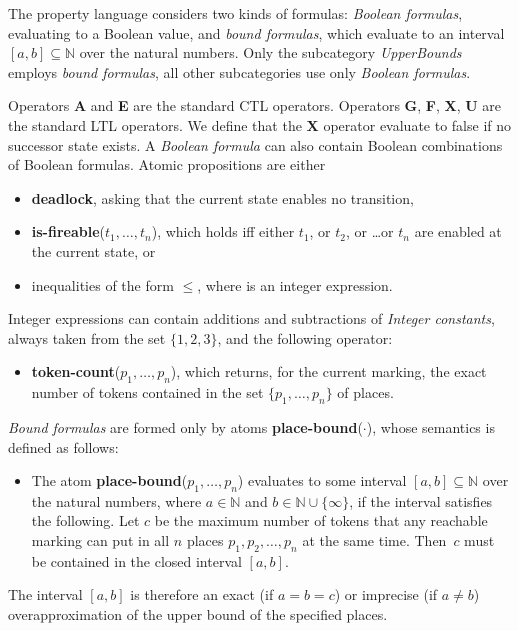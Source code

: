 \documentclass[10pt,english,a4paper]{article}
\newcommand\eqdef            {\mathrel{:=}}
\newcommand\set[1]           {{\{ #1 \mathclose \}}}
\newcommand\N                {\mathbb{N}}
\newcommand\ctla             {\textbf{A}\xspace}
\newcommand\ctle             {\textbf{E}\xspace}
\newcommand\ltlf             {\textbf{F}\xspace}
\newcommand\ltlg             {\textbf{G}\xspace}
\newcommand\ltlx             {\textbf{X}\xspace}
\newcommand\ltlu             {\textbf{U}\xspace}
\newcommand\atomleq          {\boldmath$\leq$\xspace}
\newcommand\atomdead         {\textbf{deadlock}\xspace}
\newcommand\atomisfire[1]    {\textbf{is-fireable}(#1)}
\newcommand\atomplacebnd[1]  {\textbf{place-bound}(#1)}
\newcommand\atomtokenscnt[1] {\textbf{token-count}(#1)}
\begin{document}
The property language considers two kinds of formulas:
\textit{Boolean formulas},
evaluating to a Boolean value, and \textit{bound formulas},
which evaluate to an interval $[a,b] \subseteq \N$ over the natural numbers.
Only the subcategory
\textit{UpperBounds} employs \textit{bound formulas}, all other
subcategories use only \textit{Boolean formulas}.

Operators \ctla and \ctle are the standard CTL operators.
Operators
\ltlg,
\ltlf,
\ltlx,
\ltlu
are the standard LTL operators.
We define that the \ltlx operator evaluate to false if no successor state
exists.  A \textit{Boolean formula} can also contain Boolean combinations of Boolean
formulas.
Atomic propositions are either
\begin{itemize}
\item
  \atomdead, asking that the current state enables no transition,
\item
  \atomisfire{$t_1, \ldots, t_n$}, which holds iff either $t_1$, or $t_2$,
  or \ldots or $t_n$ are enabled at the current state, or
\item
  inequalities of the form  \atomleq {},
  where  is an integer expression.
\end{itemize}

Integer expressions can contain additions and subtractions of
\emph{Integer constants}, always taken from the set $\set{1, 2, 3}$, and
the following operator:
\begin{itemize}
\item
  \atomtokenscnt{$p_1, \ldots, p_n$}, which returns, for the current
  marking, the exact number of tokens contained in the set
  $\set{p_1, \ldots, p_n}$ of places.
\end{itemize}

\textit{Bound formulas} are formed only by atoms \atomplacebnd{$\cdot$}, whose semantics
is defined as follows:
\begin{itemize}
\item
  The atom \atomplacebnd{$p_1, \ldots, p_n$} evaluates to some interval
  $[a,b] \subseteq \N$ over the natural numbers,
  where $a \in \N$ and $b \in \N \cup \set \infty$, if
  the interval satisfies the following.
  Let $c$ be the maximum number of tokens that any reachable marking can put in all $n$
  places $p_1, p_2, \ldots, p_n$ at the same time.
  Then~$c$ must be contained in the closed interval $[a,b]$.
\end{itemize}
The interval $[a,b]$ is therefore an exact (if $a = b = c$) or imprecise
(if $a \ne b$) overapproximation of the upper bound of the specified places.
\end{document}
